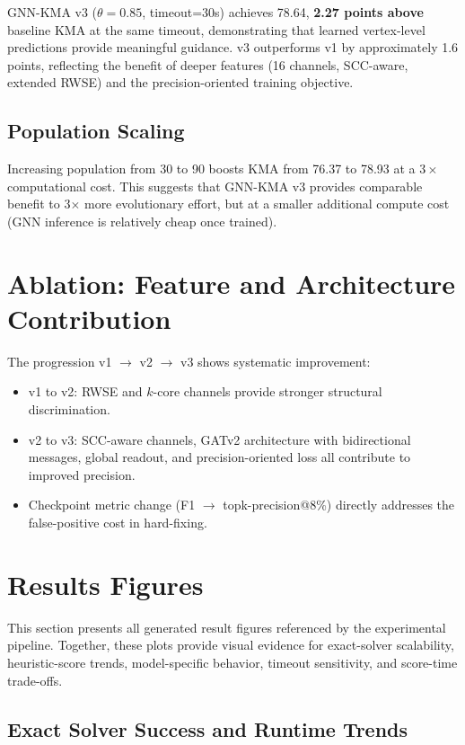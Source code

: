 \documentclass[10pt,a4paper]{report}
\theoremstyle{definition}
\newcommand{\gnnkma}{\textsc{GNN-KMA}}
\begin{document}
GNN-KMA v3 ($\theta = 0.85$, timeout=30s) achieves 78.64, \textbf{2.27 points above} baseline KMA at the same timeout, demonstrating that learned vertex-level predictions provide meaningful guidance. v3 outperforms v1 by approximately 1.6 points, reflecting the benefit of deeper features (16 channels, SCC-aware, extended RWSE) and the precision-oriented training objective.

\subsection{Population Scaling}

Increasing population from 30 to 90 boosts KMA from 76.37 to 78.93 at a $3\times$ computational cost. This suggests that \gnnkma{} v3 provides comparable benefit to 3$\times$ more evolutionary effort, but at a smaller additional compute cost (GNN inference is relatively cheap once trained).

\section{Ablation: Feature and Architecture Contribution}

The progression v1 $\to$ v2 $\to$ v3 shows systematic improvement:
\begin{itemize}
	\item v1 to v2: RWSE and $k$-core channels provide stronger structural discrimination.
	\item v2 to v3: SCC-aware channels, GATv2 architecture with bidirectional messages, global readout, and precision-oriented loss all contribute to improved precision.
	\item Checkpoint metric change (F1 $\to$ topk-precision@8\%) directly addresses the false-positive cost in hard-fixing.
\end{itemize}

\section{Results Figures}

This section presents all generated result figures referenced by the experimental pipeline. Together, these plots provide visual evidence for exact-solver scalability, heuristic-score trends, model-specific behavior, timeout sensitivity, and score-time trade-offs.

\subsection{Exact Solver Success and Runtime Trends}
\end{document}
